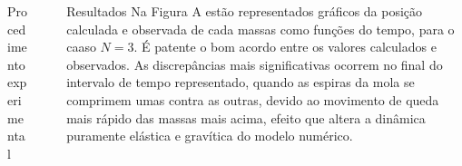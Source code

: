 \documentclass[final]{beamer}
\newlength{\sepwidth}
\newlength{\colwidth}
\newcommand{\separatorcolumn}{\begin{column}{\sepwidth}\end{column}}
\begin{document}
\begin{frame}[t]
\begin{columns}[t]
\begin{column}{\colwidth}
\begin{block}{Procedimento experimental}
	
\end{block}
\end{column}
\separatorcolumn
\begin{column}{\colwidth}
\begin{block}{Resultados}
	Na Figura A estão representados gráficos da posição calculada e observada de
	cada massas como funções do tempo, para o caaso $N=3$. É patente o bom acordo
	entre os valores calculados e observados. As discrepâncias mais significativas
	ocorrem no final do intervalo de tempo representado, quando as espiras da mola
	se comprimem umas contra as outras, devido ao movimento de queda mais rápido das
	massas mais acima, efeito que altera a dinâmica puramente elástica e gravítica
	do modelo numérico.
	

\end{block}
\end{column}
\end{columns}
\end{frame}
\end{document}
